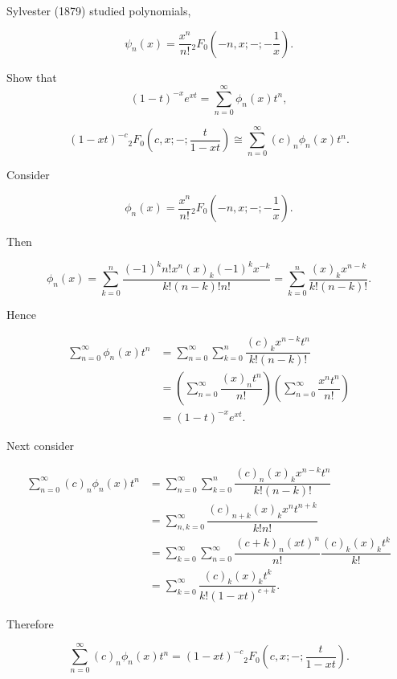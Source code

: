 \begin{problem}\label{problem4chapter18}
Sylvester (1879) studied polynomials,

$$\psi_n(x) = \dfrac{x^n}{n!} {}_2F_0 \left( -n, x; -; -\dfrac{1}{x} \right).$$

Show that
$$(1-t)^{-x} e^{xt} = \displaystyle\sum_{n=0}^{\infty} \phi_n(x) t^n,$$

$$(1-xt)^{-c} {}_2F_0 \left( c,x;-;\dfrac{t}{1-xt} \right) \cong \displaystyle\sum_{n=0}^{\infty} (c)_n \phi_n(x) t^n.$$
\end{problem}
\begin{solution}
Consider

$$\phi_n(x) = \dfrac{x^n}{n!} {}_2F_0 \left(-n,x;-;-\dfrac{1}{x} \right).$$

Then

$$\phi_n(x) = \displaystyle\sum_{k=0}^n \dfrac{(-1)^k n! x^n (x)_k (-1)^k x^{-k}}{k! (n-k)! n!} = \displaystyle\sum_{k=0}^n \dfrac{(x)_k x^{n-k}}{k! (n-k)!}.$$

Hence

$$\begin{array}{ll}
\displaystyle\sum_{n=0}^{\infty} \phi_n(x) t^n &= \displaystyle\sum_{n=0}^{\infty} \displaystyle\sum_{k=0}^n \dfrac{(c)_k x^{n-k} t^n}{k! (n-k)!} \\
&= \left( \displaystyle\sum_{n=0}^{\infty} \dfrac{(x)_n t^n}{n!} \right) \left( \displaystyle\sum_{n=0}^{\infty} \dfrac{x^n t^n}{n!} \right) \\
&= (1-t)^{-x} e^{xt}.
\end{array}$$

Next consider

$$\begin{array}{ll}
\displaystyle\sum_{n=0}^{\infty} (c)_n \phi_n(x) t^n &= \displaystyle\sum_{n=0}^{\infty} \displaystyle\sum_{k=0}^n \dfrac{(c)_n (x)_k x^{n-k} t^n}{k! (n-k)!} \\
&= \displaystyle\sum_{n,k=0}^{\infty} \dfrac{(c)_{n+k} (x)_k x^n t^{n+k}}{k! n!} \\
&= \displaystyle\sum_{k=0}^{\infty} \displaystyle\sum_{n=0}^{\infty} \dfrac{(c+k)_n (xt)^n}{n!} \dfrac{(c)_k (x)_k t^k}{k!} \\
&= \displaystyle\sum_{k=0}^{\infty} \dfrac{(c)_k (x)_k t^k}{k! (1-xt)^{c+k}}.
\end{array}$$

Therefore

$$\displaystyle\sum_{n=0}^{\infty} (c)_n \phi_n(x) t^n = (1-xt)^{-c} {}_2F_0 \left(c,x;-;\dfrac{t}{1-xt} \right).$$
\end{solution}
